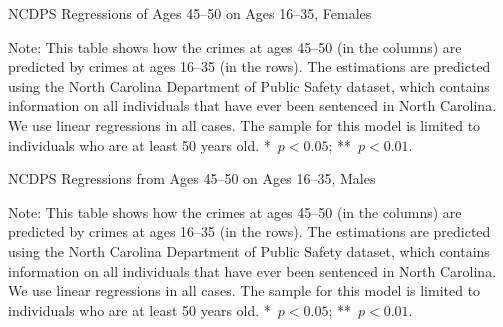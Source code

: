 \begin{table}
\caption{NCDPS Regressions of Ages 45--50 on Ages 16--35, Females} \label{tab:reg3f}
\begin{adjustbox}{max width=\textwidth}
\begin{threeparttable}

\begin{tablenotes}
\item Note: This table shows how the crimes at ages 45--50 (in the columns) are predicted by crimes at ages 16--35 (in the rows). The estimations are predicted using the North Carolina Department of Public Safety dataset, which contains information on all individuals that have ever been sentenced in North Carolina. We use linear regressions in all cases. The sample for this model is limited to individuals who are at least 50 years old. *~$p<0.05$; **~$p<0.01$.
\end{tablenotes}
\end{threeparttable}
\end{adjustbox}
\end{table}


\begin{table}
\caption{NCDPS Regressions from Ages 45--50 on Ages 16--35, Males} \label{tab:reg3m}
\begin{adjustbox}{max width=\textwidth}
\begin{threeparttable}

\begin{tablenotes}
\item Note: This table shows how the crimes at ages 45--50 (in the columns) are predicted by crimes at ages 16--35 (in the rows). The estimations are predicted using the North Carolina Department of Public Safety dataset, which contains information on all individuals that have ever been sentenced in North Carolina. We use linear regressions in all cases. The sample for this model is limited to individuals who are at least 50 years old. *~$p<0.05$; **~$p<0.01$.
\end{tablenotes}
\end{threeparttable}
\end{adjustbox}
\end{table}

